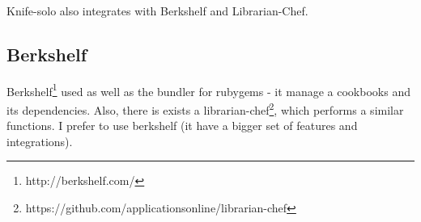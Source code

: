 Knife-solo also integrates with Berkshelf and Librarian-Chef.

\subsection{Berkshelf}

Berkshelf\footnote{http://berkshelf.com/} used as well as the bundler for rubygems - it manage a cookbooks and its dependencies. Also, there is exists a librarian-chef\footnote{https://github.com/applicationsonline/librarian-chef}, which performs a similar functions. I prefer to use berkshelf (it have a bigger set of features and integrations).